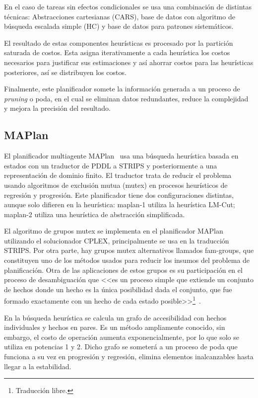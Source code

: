 \documentclass[a4paper,12pt,twocolumn]{article}
\begin{document}
En el caso de tareas sin efectos condicionales se usa una combinación de distintas técnicas: Abstracciones cartesianas (CARS), base de datos con algoritmo de búsqueda escalada simple (HC) y  base de datos para patrones sistemáticos.

El resultado de estas componentes heurísticas es procesado por la partición saturada de costos. Esta asigna iterativamente a cada heurística los costos necesarios para justificar sus estimaciones y así ahorrar costos para las heurísticas posteriores, así se distribuyen los costos.

Finalmente, este planificador somete la información generada a un proceso de \emph{pruning} o poda, en el cual se eliminan datos redundantes, reduce la complejidad y mejora la precisión del resultado.

\subsection{MAPlan}
\label{sec:maplan}

El planificador multiagente MAPlan~\citep{fiser2018maplan} usa una búsqueda heurística basada en estados con un traductor de PDDL a STRIPS y posteriormente a una representación de dominio finito. El traductor trata de reducir el problema usando algoritmos de exclusión mutua (mutex) en procesos heurísticos de regresión y progresión. Este planificador tiene dos configuraciones distintas, aunque solo difieren en la heurística: maplan-1 utiliza la heurística LM-Cut; maplan-2 utiliza una heurística de abstracción simplificada.

El algoritmo de grupos mutex se implementa en el planificador MAPlan utilizando el solucionador CPLEX, principalmente se usa en la traducción STRIPS. Por otra parte, hay grupos mutex alternativos llamados fam-groups, que constituyen uno de los métodos usados para reducir los insumos del problema de planificación. Otra de las aplicaciones de estos grupos es su participación en el proceso de desambiguación que <<es un proceso simple que extiende un conjunto de hechos donde un  hecho  es la única posibilidad dada el conjunto, que fue formado exactamente con un hecho de cada estado posible>>\footnote{Traducción libre.}~\citep{fiser2018maplan}.

En la búsqueda heurística se calcula un grafo de accesibilidad con hechos individuales y hechos en pares. Es un método ampliamente conocido, sin embargo, el costo de operación aumenta exponencialmente, por lo que solo se utiliza en potencias 1 y 2. Dicho grafo se someterá a un proceso de poda que funciona a su vez en progresión y regresión, elimina elementos inalcanzables hasta llegar a la estabilidad. 
\end{document}
